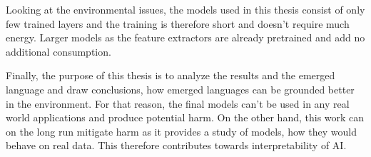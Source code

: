 Looking at the environmental issues, the models used in this thesis consist of only few trained layers and the training is therefore short and doesn't require much energy.
Larger models as the feature extractors are already pretrained and add no additional consumption.

Finally, the purpose of this thesis is to analyze the results and the emerged language and draw conclusions, how emerged languages can be grounded better in the environment.
For that reason, the final models can't be used in any real world applications and produce potential harm.
On the other hand, this work can on the long run mitigate harm as it provides a study of models, how they would behave on real data.
This therefore contributes towards interpretability of AI.
